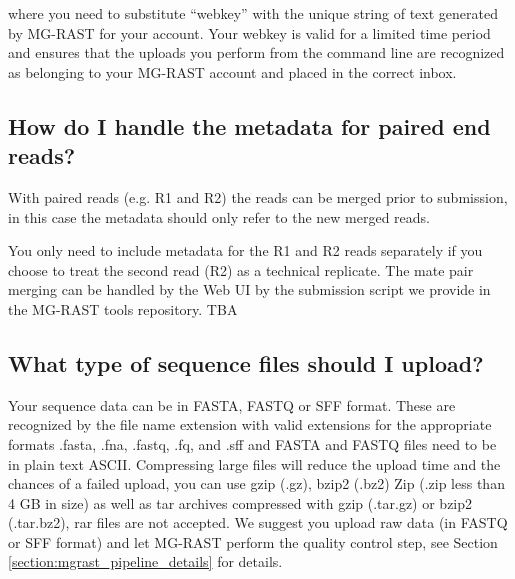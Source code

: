\documentclass[12pt,fullpage]{report}
\begin{document}
\noindent
where you need to substitute ``webkey'' with the unique string of text generated by MG-RAST for your account. Your webkey is valid for a limited time period and ensures that the uploads you perform from the command line are recognized as belonging to your MG-RAST account and placed in the correct inbox.
%
%

\subsection*{How do I handle the metadata for paired end reads?}

With paired reads (e.g. R1 and R2) the reads can be merged prior to submission, in this case the metadata should only refer to the new merged reads.

You only need to include metadata for the R1 and R2 reads separately if you choose to treat the second read (R2) as a technical replicate. The mate pair merging can be handled by the Web UI by the submission script we provide in the MG-RAST tools repository.
TBA

\subsection*{What type of sequence files should I upload?}
Your sequence data can be in FASTA, FASTQ or SFF format. These are recognized by the file name extension with valid extensions for the appropriate formats .fasta, .fna, .fastq, .fq, and .sff and FASTA and FASTQ files need to be in plain text ASCII.
Compressing large files will reduce the upload time and the chances of a failed upload, you can use gzip (.gz), bzip2 (.bz2) Zip (.zip less than 4 GB in size) as well as tar archives compressed with gzip (.tar.gz) or bzip2 (.tar.bz2), rar files are not accepted.
We suggest you upload raw data (in FASTQ or SFF format) and let MG-RAST perform the quality control step, see Section \ref{section:mgrast_pipeline_details} for details.
\end{document}
